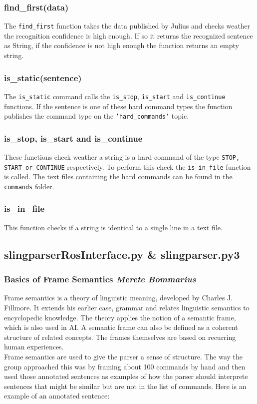 \documentclass[main.tex]{subfiles}
\begin{document}
		\subsubsection{find\_first(data)}
		The \texttt{find\_first} function takes the data published by Julius and checks weather the recognition confidence is high enough. If so it returns the recognized sentence as String, if the confidence is not high enough the function returns an empty string.\\
        
        \subsubsection{is\_static(sentence)}
        The \texttt{is\_static} command calls the \texttt{is\_stop}, \texttt{is\_start} and \texttt{is\_continue} functions. If the sentence is one of these hard command types the function publishes the command type on the \texttt{'hard\_commands'} topic.
        
		\subsubsection{is\_stop, is\_start and is\_continue}
        These functions check weather a string is a hard command of the type \texttt{STOP, START or CONTINUE} respectively. To perform this check the \texttt{is\_in\_file} function is called. The text files containing the hard commands can be found in the \texttt{commands} folder.
        
        \subsubsection{is\_in\_file}
        This function checks if a string is identical to a single line in a text file.
        
		\subsection{slingparserRosInterface.py \& slingparser.py3}     	
        \subsubsection{Basics of Frame Semantics \small{\textit{Merete Bommarius}}}        
        Frame semantics is a theory of linguistic meaning, developed by Charles J. Fillmore. It extends his earlier case, grammar and relates linguistic semantics to encyclopedic knowledge. The theory applies the notion of a semantic frame, which is also used in AI. A semantic frame can also be defined as a coherent structure of related concepts. The frames themselves are based on recurring human experiences.\\
        Frame semantics are used to give the parser a sense of structure. The way the group approached this was by framing about 100 commands by hand and then used those annotated sentences as examples of how the parser should interprete sentences that might be similar but are not in the list of commands. 
        Here is an example of an annotated sentence: 
        
\end{document}
